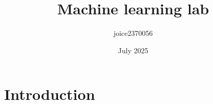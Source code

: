 \documentclass{article}
\title{Machine learning lab}
\author{joice2370056 }
\date{July 2025}
\begin{document}
\maketitle

\section{Introduction}
\end{document}
